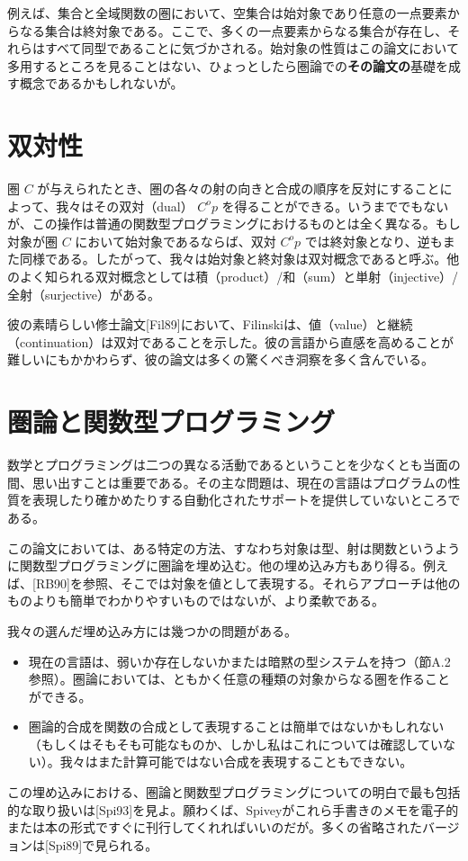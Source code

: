 \documentclass[11pt, oneside]{jsbook}   	%
\begin{document}
例えば、集合と全域関数の圏において、空集合は始対象であり任意の一点要素からなる集合は終対象である。ここで、多くの一点要素からなる集合が存在し、それらはすべて同型であることに気づかされる。始対象の性質はこの論文において多用するところを見ることはない、ひょっとしたら圏論での{\bf その論文の}基礎を成す概念であるかもしれないが。

\section{ 双対性 }
圏 $C$ が与えられたとき、圏の各々の射の向きと合成の順序を反対にすることによって、我々はその双対（dual）  $C^op$ を得ることができる。いうまででもないが、この操作は普通の関数型プログラミングにおけるものとは全く異なる。もし対象が圏 $C$ において始対象であるならば、双対 $C^op$ では終対象となり、逆もまた同様である。したがって、我々は始対象と終対象は双対概念であると呼ぶ。他のよく知られる双対概念としては積（product）/和（sum）と単射（injective）/全射（surjective）がある。

彼の素晴らしい修士論文[Fil89]において、Filinskiは、値（value）と継続（continuation）は双対であることを示した。彼の言語から直感を高めることが難しいにもかかわらず、彼の論文は多くの驚くべき洞察を多く含んでいる。
\section{ 圏論と関数型プログラミング }
数学とプログラミングは二つの異なる活動であるということを少なくとも当面の間、思い出すことは重要である。その主な問題は、現在の言語はプログラムの性質を表現したり確かめたりする自動化されたサポートを提供していないところである。

この論文においては、ある特定の方法、すなわち対象は型、射は関数というように関数型プログラミングに圏論を埋め込む。他の埋め込み方もあり得る。例えば、[RB90]を参照、そこでは対象を値として表現する。それらアプローチは他のものよりも簡単でわかりやすいものではないが、より柔軟である。

我々の選んだ埋め込み方には幾つかの問題がある。
\begin{itemize}
\item 現在の言語は、弱いか存在しないかまたは暗黙の型システムを持つ（節A.2参照）。圏論においては、ともかく任意の種類の対象からなる圏を作ることができる。
\item 圏論的合成を関数の合成として表現することは簡単ではないかもしれない（もしくはそもそも可能なものか、しかし私はこれについては確認していない）。我々はまた計算可能ではない合成を表現することもできない。
\end{itemize}
この埋め込みにおける、圏論と関数型プログラミングについての明白で最も包括的な取り扱いは[Spi93]を見よ。願わくば、Spiveyがこれら手書きのメモを電子的または本の形式ですぐに刊行してくれればいいのだが。多くの省略されたバージョンは[Spi89]で見られる。
\end{document}
